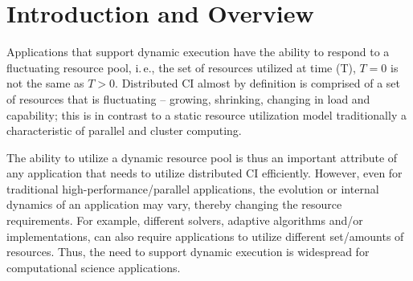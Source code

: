 \documentclass[conference,final]{IEEEtran}
\newcommand{\jhanote}[1]{ {\textcolor{red} { ***shantenu: #1 }}}
\newcommand{\alnote}[1]{ {\textcolor{blue} { ***andre: #1 }}}
\newcommand{\alnote}[1]{}
\newcommand{\jhanote}[1]{}
\newcommand{\upp}{\vspace*{-0.5em}}
\begin{document}




\section{Introduction and Overview \upp\upp}


Applications that support dynamic execution have the ability to
respond to a fluctuating resource pool, i.\,e., the set of resources
utilized at time (T), $T=0$ is not the same as $T>0$. Distributed CI
almost by definition is comprised of a set of resources that is
fluctuating -- growing, shrinking, changing in load and capability;
this is in contrast to a static resource utilization model
traditionally a characteristic of parallel and cluster computing.

The ability to utilize a dynamic resource pool is thus an important
attribute of any application that needs to utilize distributed CI
efficiently.  However, even for traditional high-performance/parallel
applications, the evolution or internal dynamics of an application may
vary, thereby changing the resource requirements.  For example,
different solvers, adaptive algorithms and/or implementations, can
also require applications to utilize different set/amounts of
resources.  Thus, the need to support dynamic execution is widespread
for computational science applications.
\end{document}
